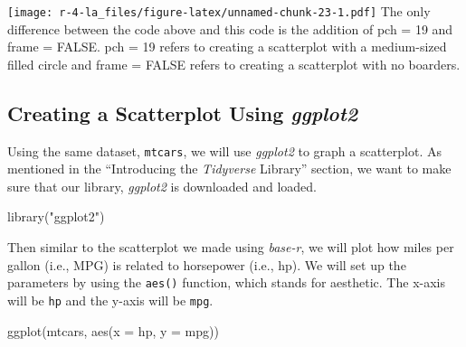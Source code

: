 \documentclass[
]{book}
\newenvironment{Shaded}{\begin{snugshade}}{\end{snugshade}}
\newcommand{\AttributeTok}[1]{\textcolor[rgb]{0.77,0.63,0.00}{#1}}
\newcommand{\ConstantTok}[1]{\textcolor[rgb]{0.00,0.00,0.00}{#1}}
\newcommand{\DecValTok}[1]{\textcolor[rgb]{0.00,0.00,0.81}{#1}}
\newcommand{\FunctionTok}[1]{\textcolor[rgb]{0.00,0.00,0.00}{#1}}
\newcommand{\NormalTok}[1]{#1}
\newcommand{\SpecialCharTok}[1]{\textcolor[rgb]{0.00,0.00,0.00}{#1}}
\newcommand{\StringTok}[1]{\textcolor[rgb]{0.31,0.60,0.02}{#1}}
\begin{document}
\begin{Shaded}
\end{Shaded}

\texttt{[image: r-4-la\_files/figure-latex/unnamed-chunk-23-1.pdf]}
The only difference between the code above and this code is the addition of pch = 19 and frame = FALSE. pch = 19 refers to creating a scatterplot with a medium-sized filled circle and frame = FALSE refers to creating a scatterplot with no boarders.

\hypertarget{creating-a-scatterplot-using-ggplot2}{%
\subsection{\texorpdfstring{Creating a Scatterplot Using \emph{ggplot2}}{Creating a Scatterplot Using ggplot2}}\label{creating-a-scatterplot-using-ggplot2}}

Using the same dataset, \texttt{mtcars}, we will use \emph{ggplot2} to graph a scatterplot. As mentioned in the ``Introducing the \emph{Tidyverse} Library'' section, we want to make sure that our library, \emph{ggplot2} is downloaded and loaded.

\begin{Shaded}
\begin{Highlighting}[]
\FunctionTok{library}\NormalTok{(}\StringTok{"ggplot2"}\NormalTok{)}
\end{Highlighting}
\end{Shaded}

Then similar to the scatterplot we made using \emph{base-r}, we will plot how miles per gallon (i.e., MPG) is related to horsepower (i.e., hp). We will set up the parameters by using the \texttt{aes()} function, which stands for aesthetic. The x-axis will be \texttt{hp} and the y-axis will be \texttt{mpg}.

\begin{Shaded}
\begin{Highlighting}[]
\FunctionTok{ggplot}\NormalTok{(mtcars, }
       \FunctionTok{aes}\NormalTok{(}\AttributeTok{x =}\NormalTok{ hp, }\AttributeTok{y =}\NormalTok{ mpg))}
\end{Highlighting}
\end{Shaded}
\end{document}
